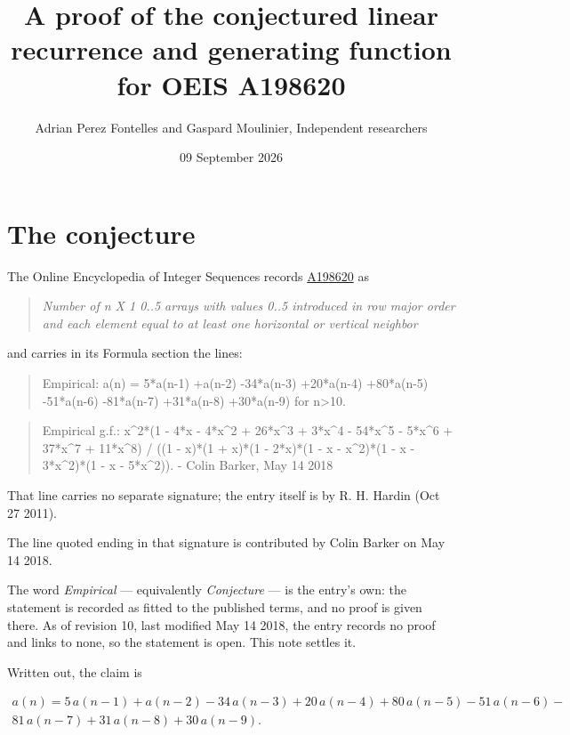 \documentclass[11pt]{article}
\title{A proof of the conjectured linear recurrence and generating function for OEIS A198620}
\author{Adrian Perez Fontelles and Gaspard Moulinier, Independent researchers}
\date{09 September 2026}
\theoremstyle{definition}
\begin{document}
\maketitle
\section{The conjecture}

The Online Encyclopedia of Integer Sequences records \href{https://oeis.org/A198620}{A198620} as

\begin{quote}\itshape Number of n X 1 0..5 arrays with values 0..5 introduced in row major order and each element equal to at least one horizontal or vertical neighbor\end{quote}

and carries in its Formula section the lines:

\begin{quote}\ttfamily Empirical: a(n) = 5*a(n-1) +a(n-2) -34*a(n-3) +20*a(n-4) +80*a(n-5) -51*a(n-6) -81*a(n-7) +31*a(n-8) +30*a(n-9) for n>10.\end{quote}

\begin{quote}\ttfamily Empirical g.f.: x\textasciicircum{}2*(1 - 4*x - 4*x\textasciicircum{}2 + 26*x\textasciicircum{}3 + 3*x\textasciicircum{}4 - 54*x\textasciicircum{}5 - 5*x\textasciicircum{}6 + 37*x\textasciicircum{}7 + 11*x\textasciicircum{}8) / ((1 - x)*(1 + x)*(1 - 2*x)*(1 - x - x\textasciicircum{}2)*(1 - x - 3*x\textasciicircum{}2)*(1 - x - 5*x\textasciicircum{}2)). - Colin Barker, May 14 2018\end{quote}

That line carries no separate signature; the entry itself is by R. H. Hardin (Oct 27 2011).

The line quoted ending in that signature is contributed by Colin Barker on May 14 2018.

The word {\itshape Empirical} --- equivalently {\itshape Conjecture} --- is the entry's own: the statement is recorded as fitted to the published terms, and no proof is given there. As of revision 10, last modified May 14 2018, the entry records no proof and links to none, so the statement is open. This note settles it.

Written out, the claim is

\begin{multline*} a(n) = 5\,a(n-1) + a(n-2) - 34\,a(n-3) + 20\,a(n-4) + 80\,a(n-5) - 51\,a(n-6) - \\ 81\,a(n-7) + 31\,a(n-8) + 30\,a(n-9). \end{multline*}
\end{document}
